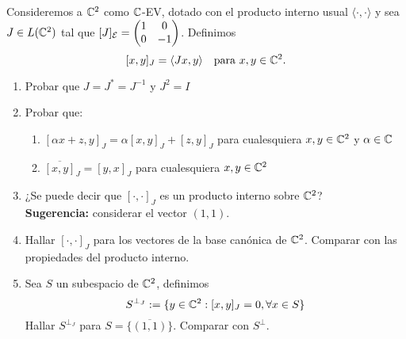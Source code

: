 \item Consideremos a $\mathbb{C}^2$ como $\mathbb{C}$-EV, dotado con el producto interno usual $\langle\cdot,\cdot\rangle$ y sea $J\in L(\mathbb{C}^2)$ tal que $[J]_{\mathcal{E}}=\begin{pmatrix}
        1&0\\0&-1
    \end{pmatrix}$. Definimos\[[x,y]_J=\langle Jx,y\rangle\quad\text{para }x,y\in\mathbb{C}^2.\]
    \begin{enumerate}
        \item Probar que $J=J^*=J^{-1}$ y $J^2=I$
            \begin{mdframed}[style=s]
                
            \end{mdframed}
        \item Probar que:
            \begin{enumerate}
                \item $[\alpha x+z,y]_J=\alpha[x,y]_J+[z,y]_J$ para cualesquiera $x,y\in\mathbb{C}^2$ y $\alpha\in\mathbb{C}$
                    \begin{mdframed}[style=s]
                        
                    \end{mdframed}
                \item $\overline{[x,y]}_J=[y,x]_J$ para cualesquiera $x,y\in\mathbb{C}^2$
                    \begin{mdframed}[style=s]
                        
                    \end{mdframed}
            \end{enumerate}
        \item ¿Se puede decir que $[\cdot,\cdot]_J$ es un producto interno sobre $\mathbb{C}^2$?\\
            \textbf{Sugerencia:} considerar el vector $(1,1)$.
            \begin{mdframed}[style=s]
                
            \end{mdframed}
        \item Hallar $[\cdot,\cdot]_J$ para los vectores de la base canónica de $\mathbb{C}^2$. Comparar con las propiedades del producto interno.
            \begin{mdframed}[style=s]
                
            \end{mdframed}
        \item Sea $S$ un subespacio de $\mathbb{C}^2$, definimos
            \[S^{\perp_J}:=\{y\in\mathbb{C}^2:[x,y]_J=0,\forall x\in S\}\]
            Hallar $S^{\perp_J}$ para $S=\overline{\{(1,1)\}}$. Comparar con $S^\perp$.
            \begin{mdframed}[style=s]
                
            \end{mdframed}
    \end{enumerate}